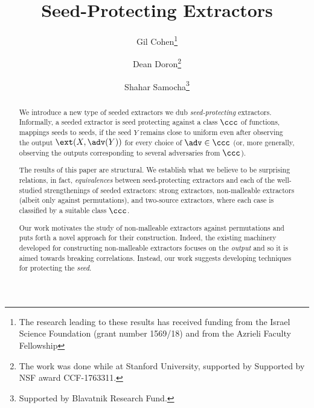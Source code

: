 \documentclass{toc}
\begin{document}
\begin{frontmatter}%

%
%
%

%
\title{Seed-Protecting Extractors}  %

%
%

%
%
%
%
%
%

%
%
%
%
%
%
%
%
%
%
%
%


%
%
%
%

%

\author[cohen]{Gil Cohen\thanks{The research leading to these
results has received funding from the Israel Science Foundation (grant number 1569/18) and from the Azrieli
Faculty Fellowship}}
\author[doron]{Dean Doron\thanks{The work was done while at Stanford University, supported by Supported by NSF award CCF-1763311.}}
\author[samocha]{Shahar Samocha\thanks{Supported by Blavatnik Research Fund.}}

%
%
%
%

%
%
%
%
%
%
%
%
\begin{abstract}
  We introduce a new type of seeded extractors we dub \emph{seed-protecting}
%
  extractors. Informally, a seeded extractor is seed protecting against a class
%
$\ccc$ of functions, %
mappings seeds to seeds, if the seed $Y$ remains close to uniform even after observing the output $\ext(X,\adv(Y))$ for every choice of $\adv \in \ccc$ (or, more generally, observing the outputs corresponding to several adversaries from $\ccc$).

The results of this paper are structural. We establish what we believe to be surprising relations, in fact, \emph{equivalences} between seed-protecting extractors and each of the well-studied strengthenings of seeded extractors: strong extractors, non-malleable extractors (albeit only against permutations), and two-source extractors, where each case is classified by a suitable class $\ccc$. 

Our work motivates the study of non-malleable extractors against permutations and puts forth a novel approach for their construction. Indeed, the existing machinery developed for constructing non-malleable extractors focuses on the \emph{output} and so it is aimed towards breaking correlations. Instead, our work suggests developing techniques for protecting the \emph{seed}. 
\end{abstract}

%

\end{frontmatter}
\end{document}
